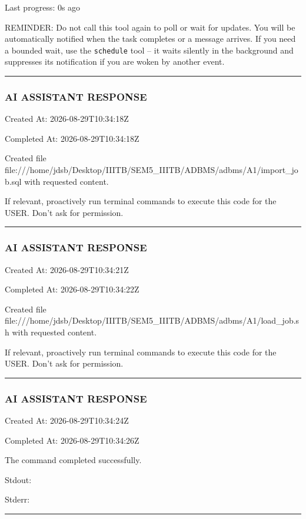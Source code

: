 \documentclass[11pt,a4paper]{article}
\begin{document}
Last progress: 0s ago



REMINDER: Do not call this tool again to poll or wait for updates. You will be automatically notified when the task completes or a message arrives. If you need a bounded wait, use the \texttt{schedule} tool -- it waits silently in the background and suppresses its notification if you are woken by another event.


\hrule

\subsubsection{AI ASSISTANT RESPONSE}

Created At: 2026-08-29T10:34:18Z

Completed At: 2026-08-29T10:34:18Z

Created file file:///home/jdsb/Desktop/IIITB/SEM5\_IIITB/ADBMS/adbms/A1/import\_job.sql with requested content.

If relevant, proactively run terminal commands to execute this code for the USER. Don't ask for permission.


\hrule

\subsubsection{AI ASSISTANT RESPONSE}

Created At: 2026-08-29T10:34:21Z

Completed At: 2026-08-29T10:34:22Z

Created file file:///home/jdsb/Desktop/IIITB/SEM5\_IIITB/ADBMS/adbms/A1/load\_job.sh with requested content.

If relevant, proactively run terminal commands to execute this code for the USER. Don't ask for permission.


\hrule

\subsubsection{AI ASSISTANT RESPONSE}

Created At: 2026-08-29T10:34:24Z

Completed At: 2026-08-29T10:34:26Z


The command completed successfully.

Stdout:


Stderr:


\hrule
\end{document}
